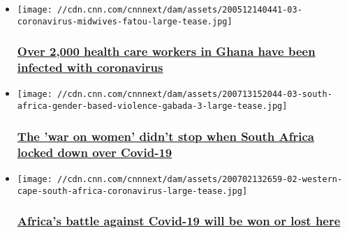 \begin{itemize}
\item
  \href{/2020/07/18/africa/ghana-healthcare-workers-coronavirus/index.html}{}

  \texttt{[image: //cdn.cnn.com/cnnnext/dam/assets/200512140441-03-coronavirus-midwives-fatou-large-tease.jpg]}

  \hypertarget{over-2000-health-care-workers-in-ghana-have-been-infected-with-coronavirus}{%
  \subsubsection{\texorpdfstring{\href{/2020/07/18/africa/ghana-healthcare-workers-coronavirus/index.html}{Over
  2,000 health care workers in Ghana have been infected with
  coronavirus}}{Over 2,000 health care workers in Ghana have been infected with coronavirus}}\label{over-2000-health-care-workers-in-ghana-have-been-infected-with-coronavirus}}
\item
  \href{/2020/07/14/africa/south-africa-women-gender-based-violence-intl-afr/index.html}{}

  \texttt{[image: //cdn.cnn.com/cnnnext/dam/assets/200713152044-03-south-africa-gender-based-violence-gabada-3-large-tease.jpg]}

  \hypertarget{the-war-on-women-didnt-stop-when-south-africa-locked-down-over-covid-19-}{%
  \subsubsection{\texorpdfstring{\href{/2020/07/14/africa/south-africa-women-gender-based-violence-intl-afr/index.html}{The
  'war on women' didn't stop when South Africa locked down over Covid-19
  }}{The 'war on women' didn't stop when South Africa locked down over Covid-19 }}\label{the-war-on-women-didnt-stop-when-south-africa-locked-down-over-covid-19-}}
\item
  \href{/2020/07/06/africa/western-cape-south-africa-coronavirus-epicenter-intl/index.html}{}

  \texttt{[image: //cdn.cnn.com/cnnnext/dam/assets/200702132659-02-western-cape-south-africa-coronavirus-large-tease.jpg]}

  \hypertarget{africas-battle-against-covid-19-will-be-won-or-lost-here}{%
  \subsubsection{\texorpdfstring{\href{/2020/07/06/africa/western-cape-south-africa-coronavirus-epicenter-intl/index.html}{Africa's
  battle against Covid-19 will be won or lost
  here}}{Africa's battle against Covid-19 will be won or lost here}}\label{africas-battle-against-covid-19-will-be-won-or-lost-here}}
\end{itemize}

